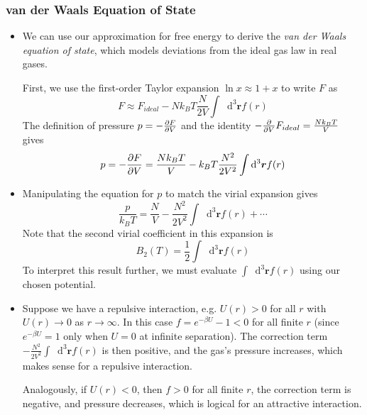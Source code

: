 \documentclass[11pt, a4paper]{article}
\newcommand{\diff}{\mathop{}\!\mathrm{d}} %
\begin{document}
\subsubsection{van der Waals Equation of State}
\begin{itemize}
	\item We can use our approximation for free energy to derive the \textit{van der Waals equation of state}, which models deviations from the ideal gas law in real gases. 
	
	First, we use the first-order Taylor expansion $ \ln x \approx 1 + x $ to write $ F $ as
	\begin{equation*}
		F \approx F_{ideal} - N k_{B}T \frac{N}{2V} \int \diff^{3}\bm{r} f(r)
	\end{equation*}
	The definition of pressure $ p = -\pdv{F}{V} $ and the identity $ -\pdv{}{V} F_{ideal} = \frac{Nk_{B}T}{V} $ gives
	\begin{equation*}
		p = -\pdv{F}{V} = \frac{Nk_{B}T}{V} - k_{B}T \frac{N^{2}}{2V^{2}} \int \diff^{3}\bm{r} f(r)
	\end{equation*}
	
	\item Manipulating the equation for $ p $ to match the virial expansion gives
	\begin{equation*}
		\frac{p}{k_{B}T} = \frac{N}{V} - \frac{N^{2}}{2V^{2}} \int \diff^{3}\bm{r} f(r) + \cdots
	\end{equation*}
	Note that the second virial coefficient in this expansion is 
	\begin{equation*}
		B_{2}(T) = \frac{1}{2} \int \diff^{3}\bm{r} f(r)
	\end{equation*}
	To interpret this result further, we must evaluate $ \int \diff^{3}\bm{r} f(r) $ using our chosen potential.
	
	\item Suppose we have a repulsive interaction, e.g. $ U(r) > 0 $ for all $ r $ with $ U(r) \to 0 $ as $ r \to \infty $. In this case $ f = e^{-\beta U} - 1 < 0 $ for all finite $ r $  (since $ e^{-\beta U} = 1 $ only when $ U = 0 $ at infinite separation). The correction term $ - \frac{N^{2}}{2V^{2}} \int \diff^{3}\bm{r} f(r) $ is then positive, and the gas's pressure increases, which makes sense for a repulsive interaction.
	
	Analogously, if $ U(r) < 0 $, then $ f > 0 $ for all finite $ r $, the correction term is negative, and pressure decreases, which is logical for an attractive interaction.
	

\end{itemize}
\end{document}
